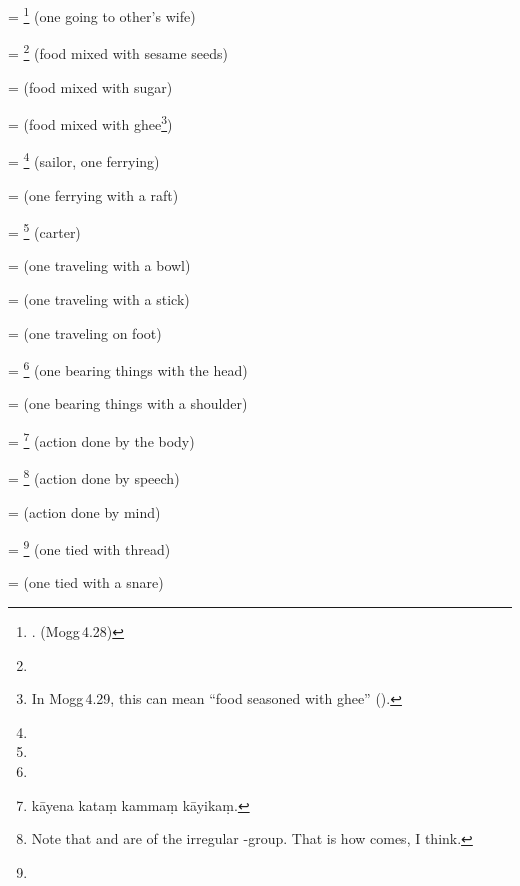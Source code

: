  = \footnote{. (Mogg\,4.28)} (one going to other's wife) \par
{} = \footnote{} (food mixed with sesame seeds) \par
{} =  (food mixed with sugar) \par
{} =  (food mixed with ghee\footnote{In Mogg\,4.29, this can mean ``food seasoned with ghee'' ().}) \par
{} = \footnote{} (sailor, one ferrying) \par
{} =  (one ferrying with a raft) \par
{} = \footnote{} (carter) \par
{} =  (one traveling with a bowl) \par
{} =  (one traveling with a stick) \par
{} =  (one traveling on foot) \par
{} = \footnote{} (one bearing things with the head) \par
{} =  (one bearing things with a shoulder) \par
{} = \footnote{k\=ayena kata\d m kamma\d m k\=ayika\d m.} (action done by the body) \par
{} = \footnote{Note that  and  are of the irregular -group. That is how  comes, I think.} (action done by speech) \par
{} =  (action done by mind) \par
{} = \footnote{} (one tied with thread) \par
{} =  (one tied with a snare) \par
